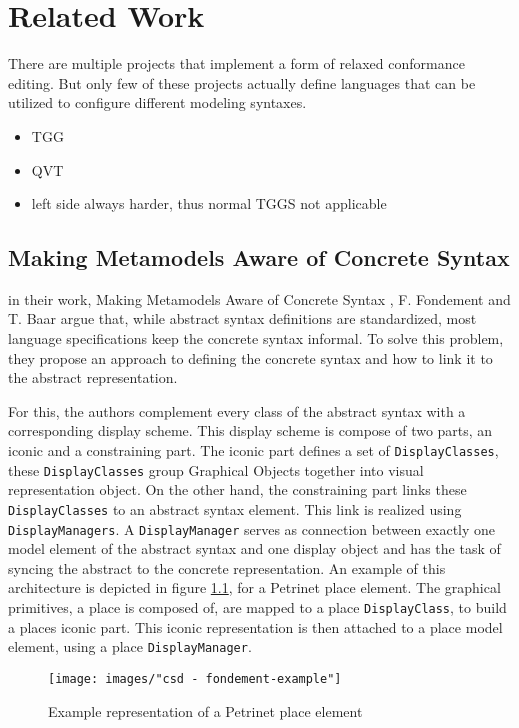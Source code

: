 \chapter{Related Work}
\label{chap:related_work}
There are multiple projects that implement a form of relaxed conformance editing. But only few of these projects actually define languages that can be utilized to configure different modeling syntaxes. 


\begin{itemize}
  \item TGG
  \item QVT
  \item left side always harder, thus normal TGGS not applicable
\end{itemize}


\section{Making Metamodels Aware of Concrete Syntax}
\label{sec:fondement}
in their work, Making Metamodels Aware of Concrete Syntax \cite{fondement_making_2005}, F. Fondement and T. Baar argue that, while abstract syntax definitions are standardized, most language specifications keep the concrete syntax informal. To solve this problem, they propose an approach to defining the concrete syntax and how to link it to the abstract representation.

For this, the authors complement every class of the abstract syntax with a corresponding display scheme. This display scheme is compose of two parts, an iconic and a constraining part. The iconic part defines a set of \texttt{DisplayClasses}, these \texttt{DisplayClasses} group Graphical Objects together into visual representation object. On the other hand, the constraining part links these \texttt{DisplayClasses} to an abstract syntax element. This link is realized using \texttt{DisplayManagers}. A \texttt{DisplayManager} serves as connection between exactly one model element of the abstract syntax and one display object and has the task of syncing the abstract to the concrete representation. An example of this architecture is depicted in figure \ref{fig:fondement_dm}, for a Petrinet place element. The graphical primitives, a place is composed of, are mapped to a place \texttt{DisplayClass}, to build a places iconic part. This iconic representation is then attached to a place model element, using a place \texttt{DisplayManager}.


\begin{figure}[H]
  \centering
  \texttt{[image: images/"csd - fondement-example"]}
  \caption{Example representation of a Petrinet place element}
  \label{fig:fondement_dm}
\end{figure}


